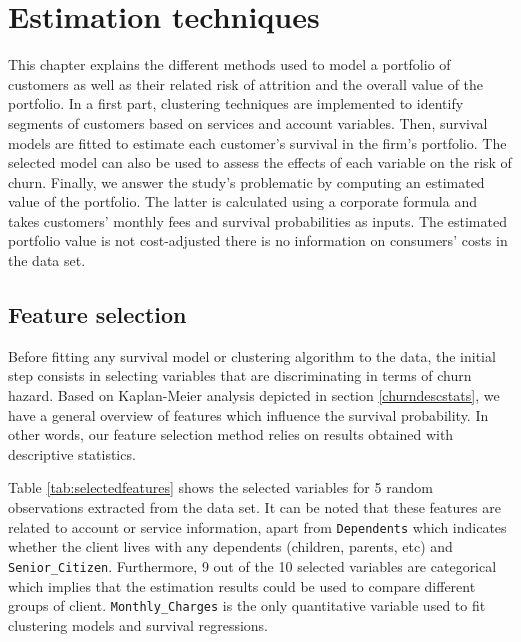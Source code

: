\documentclass[
]{book}
\begin{document}
\hypertarget{estimation}{%
\chapter{Estimation techniques}\label{estimation}}

This chapter explains the different methods used to model a portfolio of customers as well as their related risk of attrition and the overall value of the portfolio. In a first part, clustering techniques are implemented to identify segments of customers based on services and account variables. Then, survival models are fitted to estimate each customer's survival in the firm's portfolio. The selected model can also be used to assess the effects of each variable on the risk of churn. Finally, we answer the study's problematic by computing an estimated value of the portfolio. The latter is calculated using a corporate formula and takes customers' monthly fees and survival probabilities as inputs. The estimated portfolio value is not cost-adjusted there is no information on consumers' costs in the data set.

\hypertarget{featureselection}{%
\section{Feature selection}\label{featureselection}}

Before fitting any survival model or clustering algorithm to the data, the initial step consists in selecting variables that are discriminating in terms of churn hazard. Based on Kaplan-Meier analysis depicted in section \ref{churndescstats}, we have a general overview of features which influence the survival probability. In other words, our feature selection method relies on results obtained with descriptive statistics.

Table \ref{tab:selectedfeatures} shows the selected variables for 5 random observations extracted from the data set. It can be noted that these features are related to account or service information, apart from \texttt{Dependents} which indicates whether the client lives with any dependents (children, parents, etc) and \texttt{Senior\_Citizen}. Furthermore, 9 out of the 10 selected variables are categorical which implies that the estimation results could be used to compare different groups of client. \texttt{Monthly\_Charges} is the only quantitative variable used to fit clustering models and survival regressions.
\end{document}
